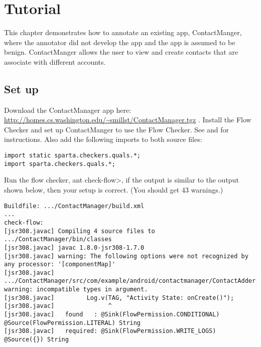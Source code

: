 \htmlhr


\newcommand{\method}[1]{\paragraph{#1}}
\newcommand{\annomethod}[1]{\small{\texttt{#1}}\newline}
\chapter{Tutorial\label{tutorial}}

This chapter demonstrates how to annotate an existing app, ContactManger,
 where the annotator did not develop the app and the app is assumed to be benign.
   ContactManger allows the user to view and create contacts that are associate 
   with different accounts.  


\section{Set up}
Download the ContactManager app here: \url{http://homes.cs.washington.edu/~smillst/ContactManager.tgz} . 
Install the Flow Checker and set up ContactManger to use the Flow Checker. 
See   and  for instructions. Also add 
the following imports to both source files:
\begin{Verbatim} 
import static sparta.checkers.quals.*;
import sparta.checkers.quals.*;
\end{Verbatim}

Run the flow checker, \<ant check-flow>, if the output is similar to 
the output shown below, then your setup is correct.  (You should get 43 warnings.)

\begin{Verbatim}
Buildfile: .../ContactManager/build.xml
...
check-flow:
[jsr308.javac] Compiling 4 source files to .../ContactManager/bin/classes
[jsr308.javac] javac 1.8.0-jsr308-1.7.0
[jsr308.javac] warning: The following options were not recognized by any processor: '[componentMap]'
[jsr308.javac] .../ContactManager/src/com/example/android/contactmanager/ContactAdder.java:75: warning: incompatible types in argument.
[jsr308.javac]         Log.v(TAG, "Activity State: onCreate()");
[jsr308.javac]               ^
[jsr308.javac]   found   : @Sink(FlowPermission.CONDITIONAL) @Source(FlowPermission.LITERAL) String
[jsr308.javac]   required: @Sink(FlowPermission.WRITE_LOGS) @Source({}) String
\end{Verbatim} 

